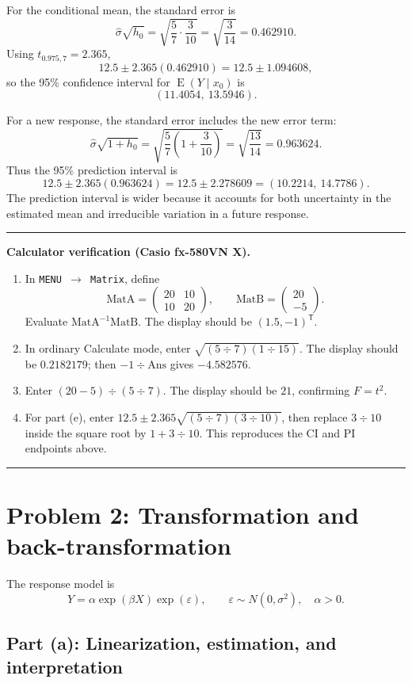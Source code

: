 \documentclass[11pt]{article}
\newcommand{\trans}{\mathsf T}
\newcommand{\E}{\operatorname{E}}
\newcommand{\answer}[1]{\boxed{\displaystyle #1}}
\newenvironment{checkbox}
  {\par\medskip\noindent\begin{minipage}{\linewidth}
   \color{navy!90!black}\hrule\medskip
   \textbf{\sffamily Calculator verification (Casio fx-580VN X).}\ }
  {\medskip\hrule\end{minipage}\par\medskip}
\begin{document}
For the conditional mean, the standard error is
\[
\hat\sigma\sqrt{h_0}
=\sqrt{\frac57\cdot\frac3{10}}
=\sqrt{\frac3{14}}
=0.462910.
\]
Using \(t_{0.975,7}=2.365\),
\[
12.5\pm2.365(0.462910)
=12.5\pm1.094608,
\]
so the 95\% confidence interval for \(\E(Y\mid x_0)\) is
\[
\answer{(11.4054,\ 13.5946)}.
\]

For a new response, the standard error includes the new error term:
\[
\hat\sigma\sqrt{1+h_0}
=\sqrt{\frac57\left(1+\frac3{10}\right)}
=\sqrt{\frac{13}{14}}
=0.963624.
\]
Thus the 95\% prediction interval is
\[
12.5\pm2.365(0.963624)
=12.5\pm2.278609
=\answer{(10.2214,\ 14.7786)}.
\]
The prediction interval is wider because it accounts for both uncertainty
in the estimated mean and irreducible variation in a future response.

\begin{checkbox}
\begin{enumerate}
\item In \texttt{MENU \(\to\) Matrix}, define
\[
\mathrm{MatA}=\begin{pmatrix}20&10\\10&20\end{pmatrix},
\qquad
\mathrm{MatB}=\begin{pmatrix}20\\-5\end{pmatrix}.
\]
Evaluate \(\mathrm{MatA}^{-1}\mathrm{MatB}\). The display should be
\((1.5,-1)^\trans\).
\item In ordinary Calculate mode, enter
\(\sqrt{(5\div7)(1\div15)}\). The display should be \(0.2182179\);
then \(-1\div\text{Ans}\) gives \(-4.582576\).
\item Enter \((20-5)\div(5\div7)\). The display should be \(21\), confirming
\(F=t^2\).
\item For part (e), enter
\(12.5\pm2.365\sqrt{(5\div7)(3\div10)}\), then replace \(3\div10\)
inside the square root by \(1+3\div10\). This reproduces the CI and PI
endpoints above.
\end{enumerate}
\end{checkbox}

\clearpage
\section{Problem 2: Transformation and back-transformation}

The response model is
\[
Y=\alpha\exp(\beta X)\exp(\varepsilon),
\qquad \varepsilon\sim N(0,\sigma^2),\quad \alpha>0.
\]

\subsection{Part (a): Linearization, estimation, and interpretation}
\end{document}
